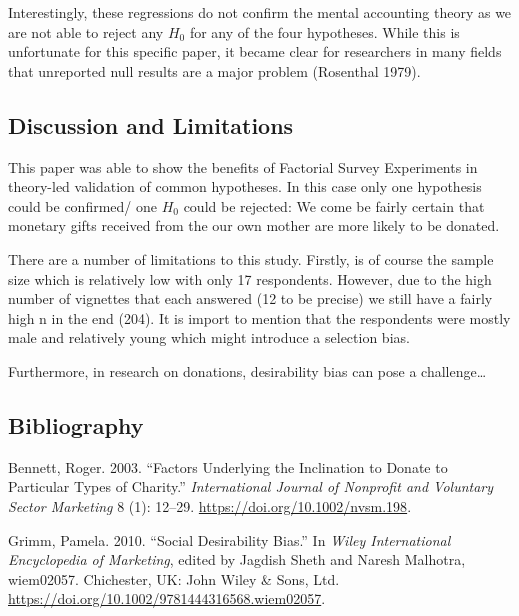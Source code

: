 \documentclass[
  12pt,
]{article}
\begin{document}
Interestingly, these regressions do not confirm the mental accounting
theory as we are not able to reject any \(H_0\) for any of the four
hypotheses. While this is unfortunate for this specific paper, it became
clear for researchers in many fields that unreported null results are a
major problem (Rosenthal 1979).

\hypertarget{discussion-and-limitations}{%
\subsection{Discussion and
Limitations}\label{discussion-and-limitations}}

This paper was able to show the benefits of Factorial Survey Experiments
in theory-led validation of common hypotheses. In this case only one
hypothesis could be confirmed/ one \(H_0\) could be rejected: We come be
fairly certain that monetary gifts received from the our own mother are
more likely to be donated.

There are a number of limitations to this study. Firstly, is of course
the sample size which is relatively low with only 17 respondents.
However, due to the high number of vignettes that each answered (12 to
be precise) we still have a fairly high n in the end (204). It is import
to mention that the respondents were mostly male and relatively young
which might introduce a selection bias.

Furthermore, in research on donations, desirability bias can pose a
challenge\ldots{}

\hypertarget{bibliography}{%
\subsection*{Bibliography}\label{bibliography}}

\hypertarget{refs}{}
\leavevmode\hypertarget{ref-bennettFactorsUnderlyingInclination2003}{}%
Bennett, Roger. 2003. ``Factors Underlying the Inclination to Donate to
Particular Types of Charity.'' \emph{International Journal of Nonprofit
and Voluntary Sector Marketing} 8 (1): 12--29.
\url{https://doi.org/10.1002/nvsm.198}.

\leavevmode\hypertarget{ref-grimmSocialDesirabilityBias2010}{}%
Grimm, Pamela. 2010. ``Social Desirability Bias.'' In \emph{Wiley
International Encyclopedia of Marketing}, edited by Jagdish Sheth and
Naresh Malhotra, wiem02057. Chichester, UK: John Wiley \& Sons, Ltd.
\url{https://doi.org/10.1002/9781444316568.wiem02057}.
\end{document}

